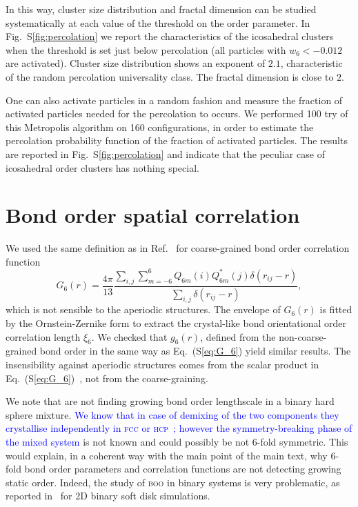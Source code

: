 \documentclass[prl,twocolumn,notitlepage]{revtex4-1}
\begin{document}
In this way, cluster size distribution and fractal dimension can be studied systematically at each value of the threshold on the order parameter. In Fig.~S\ref{fig:percolation} we report the characteristics of the icosahedral clusters when the threshold is set just below percolation (all particles with $w_6<-0.012$ are activated). Cluster size distribution shows an exponent of $2.1$, characteristic of the random percolation universality class. The fractal dimension is close to $2$.

One can also activate particles in a random fashion and measure the fraction of activated particles needed for the percolation to occurs. We performed 100 try of this Metropolis algorithm on 160 configurations, in order to estimate the percolation probability function of the fraction of activated particles. The results are reported in Fig.~S\ref{fig:percolation} and indicate that the peculiar case of icosahedral order clusters has nothing special.

\section*{Bond order spatial correlation}

We used the same definition as in Ref.~\cite{tanaka2010critical} for coarse-grained bond order correlation function
\begin{equation}
	G_6(r) = \frac{4\pi}{13}\frac{\sum_{i,j} \sum_{m=-6}^{6} Q_{6 m}(i) Q_{6 m}^{*}(j) \delta(r_{ij}-r)}{\sum_{i,j} \delta(r_{ij}-r)},
	\label{eq:G_6}
\end{equation}
which is not sensible to the aperiodic structures. The envelope of $G_6(r)$ is fitted by the Ornstein-Zernike form to extract the crystal-like bond orientational order correlation length $\xi_6$. We checked that $g_6(r)$, defined from the non-coarse-grained bond order in the same way as Eq.~(S\ref{eq:G_6}) yield similar results. The insensibility against aperiodic structures comes from the scalar product in Eq.~(S\ref{eq:G_6})~\cite{Tomida1995}, not from the coarse-graining.

We note that \citet{Charbonneau} are not finding growing bond order lengthscale in a binary hard sphere mixture. \textcolor{blue}{We know that in case of demixing of the two components they crystallise independently in \textsc{fcc} or \textsc{hcp}~\cite{Hopkins2011b,Hopkins2012}; however the symmetry-breaking phase of the mixed system} is not known and could possibly be not 6-fold symmetric. This would explain, in a coherent way with the main point of the main text, why 6-fold bond order parameters and correlation functions are not detecting growing static order. Indeed, the study of \textsc{boo} in binary systems is very problematic, as reported in~\citep{tanaka2010critical, KawasakiJPCM} for 2D binary soft disk simulations.
\end{document}

